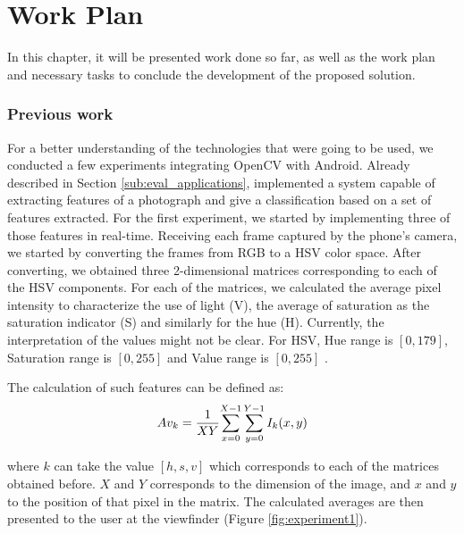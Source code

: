 \chapter{Work Plan}
\label{cha:work_plan}

In this chapter, it will be presented work done so far, as well as the work plan and necessary tasks to conclude the development of the proposed solution.

\subsection{Previous work}
\label{sub:previous_work}

For a better understanding of the technologies that were going to be used, we conducted a few experiments integrating OpenCV with Android.
Already described in Section \ref{sub:eval_applications}, \citeauthor{datta2006studying} \cite{datta2006studying} implemented a system capable of extracting features of a photograph and give a classification based on a set of features extracted.
For the first experiment, we started by implementing three of those features in real-time. Receiving each frame captured by the phone's camera, we started by converting the frames from RGB to a HSV color space. After converting, we obtained three 2-dimensional matrices corresponding to each of the HSV components. For each of the matrices, we calculated the average pixel intensity to characterize the use of light (V), the average of saturation as the saturation indicator (S) and similarly for the hue (H). Currently, the interpretation of the values might not be clear. For HSV, Hue range is $[0,179]$, Saturation range is $[0,255]$ and Value range is $[0,255]$ \cite{OCV}.

The calculation of such features can be defined as:
\begin{equation}
Av_{k} = {{1 \over XY} {\sum_{x=0}^{X-1}{\sum_{y=0}^{Y-1}{I_{k}(x,y)}}}}
\label{eq:average_hsv}
\end{equation}

where $k$ can take the value $[h,s,v]$ which corresponds to each of the matrices obtained before. $X$ and $Y$ corresponds to the dimension of the image, and $x$ and $y$ to the position of that pixel in the matrix.
The calculated averages are then presented to the user at the viewfinder (Figure \ref{fig:experiment1}).

